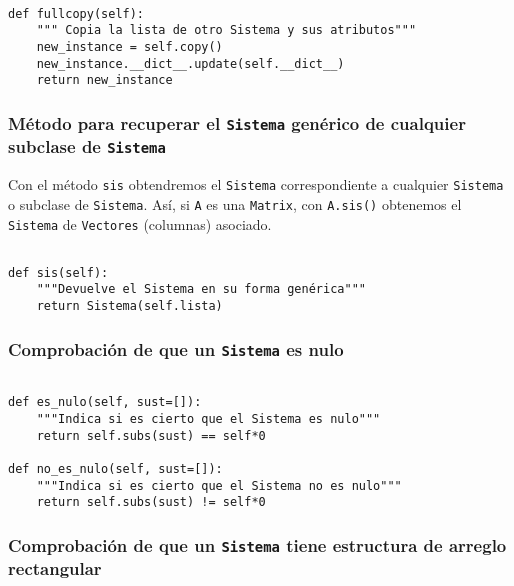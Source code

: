 \documentclass[11pt]{report}
\begin{document}
\begin{verbatim}

def fullcopy(self):
    """ Copia la lista de otro Sistema y sus atributos"""
    new_instance = self.copy()
    new_instance.__dict__.update(self.__dict__)
    return new_instance

\end{verbatim}

\subsubsection{Método para recuperar el \texttt{Sistema} genérico de cualquier subclase de \texttt{Sistema}}
\label{sec:org3af139d}

Con el método \texttt{sis} obtendremos el \texttt{Sistema} correspondiente a
cualquier \texttt{Sistema} o subclase de \texttt{Sistema}. Así, si \texttt{A} es una
\texttt{Matrix}, con \texttt{A.sis()} obtenemos el \texttt{Sistema} de \texttt{Vectores}
(columnas) asociado.
\begin{verbatim}

def sis(self):
    """Devuelve el Sistema en su forma genérica"""
    return Sistema(self.lista)

\end{verbatim}

\subsubsection{Comprobación de que un \texttt{Sistema} es nulo}
\label{sec:orgace21d5}

\begin{verbatim}

def es_nulo(self, sust=[]):
    """Indica si es cierto que el Sistema es nulo"""
    return self.subs(sust) == self*0

def no_es_nulo(self, sust=[]):
    """Indica si es cierto que el Sistema no es nulo"""
    return self.subs(sust) != self*0

\end{verbatim}

\subsubsection{Comprobación de que un \texttt{Sistema}  tiene estructura de arreglo rectangular}
\label{sec:orgf055f9a}
\end{document}
